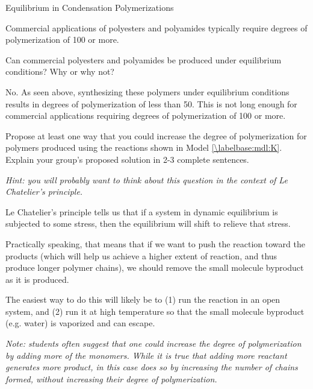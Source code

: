 \begin{activity}{Equilibrium in Condensation Polymerizations}
\begin{infobox}
	Commercial applications of polyesters and polyamides typically require degrees of polymerization of 100 or more.  

\end{infobox}

\begin{ctqs}
		
		\question Can commercial polyesters and polyamides be produced under equilibrium conditions?  Why or why not?
		
			\begin{solution}[1.5in]{}
			
				No. As seen above, synthesizing these polymers under equilibrium conditions results in degrees of polymerization of less than 50.  This is not long enough for commercial applications requiring degrees of polymerization of 100 or more.
			
			\end{solution}
			
		\question Propose at least one way that you could increase the degree of polymerization for polymers produced using the reactions shown in Model \ref{\labelbase:mdl:K}.  Explain your group's proposed solution in 2-3 complete sentences.
		
			\emph{Hint: you will probably want to think about this question in the context of Le Chatelier's principle.}
		
			\begin{solution}[2in]{}
			
				Le Chatelier's principle tells us that if a system in dynamic equilibrium is subjected to some stress, then the equilibrium will shift to relieve that stress.
				
				Practically speaking, that means that if we want to push the reaction toward the products (which will help us achieve a higher extent of reaction, and thus produce longer polymer chains), we should remove the small molecule byproduct as it is produced.
				
				The easiest way to do this will likely be to (1) run the reaction in an open system, and (2) run it at high temperature so that the small molecule byproduct (e.g. water) is vaporized and can escape.
				
				\emph{Note: students often suggest that one could increase the degree of polymerization by adding more of the monomers.  While it is true that adding more reactant generates more product, in this case does so by increasing the number of chains formed, without increasing their degree of polymerization.}
			

\end{solution}
\end{ctqs}
\end{activity}
